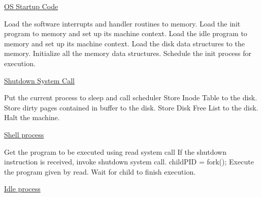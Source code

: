 \begin{algorithm}
\caption{\href{http://exposnitc.github.io/os_design-files/os_startup.html}{OS Startup Code}}
\begin{algorithmic}
\STATE Load the software interrupts and handler routines to memory.
\STATE Load the init program to memory and set up its machine context.
\STATE Load the idle program to memory and set up its machine context.
\STATE Load the disk data structures to the memory.
\STATE Initialize all the memory data structures.
\STATE Schedule the init process for execution.
\end{algorithmic}
\end{algorithm}


\begin{algorithm}
\caption{\href{http://exposnitc.github.io/os_design-files/misc.html#shutdown}{Shutdown System Call}}
\begin{algorithmic}
    \STATE Put the current process to sleep and call scheduler
\ENDWHILE
\STATE Store Inode Table to the disk.
\STATE Store dirty pages contained in buffer to the disk.     
\STATE Store Disk Free List to the disk.
\STATE Halt the machine.
\end{algorithmic}
\end{algorithm}


\begin{algorithm}
\caption{\href{http://exposnitc.github.io/os_design-files/misc.html#shell}{Shell process}}
\begin{algorithmic}
    \STATE Get the program to be executed using read system call
    \STATE If the shutdown instruction is received, invoke shutdown system call.
    \STATE childPID = fork();
        \STATE Execute the program given by read.
    \ELSE 
        \STATE Wait for child to finish execution.
    \ENDIF
\ENDWHILE

\end{algorithmic}
\end{algorithm}


\begin{algorithm}
\caption{\href{http://exposnitc.github.io/os_design-files/misc.html#idle}{Idle process}}
\begin{algorithmic}
\ENDWHILE
\end{algorithmic}
\end{algorithm}
